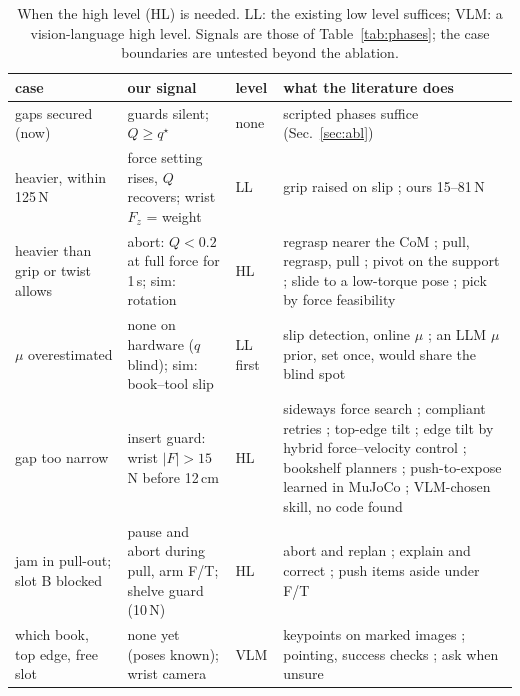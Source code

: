 \documentclass[10pt,twocolumn]{article}
\begin{document}
\begin{table}[t]\centering\footnotesize
\setlength{\tabcolsep}{1.8pt}
\begin{tabularx}{\columnwidth}{@{}>{\raggedright\arraybackslash}p{1.25cm}>{\raggedright\arraybackslash}p{1.95cm}l>{\raggedright\arraybackslash}X@{}}
\toprule
case & our signal & level & what the literature does \\
\midrule
gaps secured (now) & guards silent; $Q\ge q^\star$ & none & scripted phases suffice (Sec.~\ref{sec:abl}) \\
heavier, within 125\,N & force setting rises, $Q$ recovers; wrist $F_z$ = weight & LL & grip raised on slip
\cite{romano2011}; ours 15--81\,N \\
heavier than grip or twist allows & abort: $Q<0.2$ at full force for 1\,s; sim: rotation & HL & regrasp nearer
the CoM \cite{kolamuri2021rotation}; pull, regrasp, pull \cite{prats2008uji}; pivot on the support
\cite{hou2019pivot}; slide to a low-torque pose \cite{king2013}; pick by force feasibility \cite{holladay2021} \\
$\mu$ over\-estimated & none on hardware ($q$ blind); sim: book--tool slip & LL first & slip detection, online
$\mu$ \cite{su2015force,khamis2021friction,dong2019maintaining}; an LLM $\mu$ prior, set once, would share the
blind spot \cite{xie2024deligrasp} \\
gap too narrow & insert guard: wrist $|F|>15$\,N before 12\,cm & HL & sideways force search \cite{prats2008uji};
compliant retries \cite{ren2024collision}; top-edge tilt \cite{prats2008riai,wieczorek2022trixi}; edge tilt by
hybrid force--velocity control \cite{hou2019hybrid}; bookshelf planners \cite{cheng2024hidex,toussaint2020force};
push-to-expose learned in MuJoCo \cite{zhou2022ungraspable}; VLM-chosen skill, no code found \cite{ma2024dexdiff} \\
jam in pull-out; slot B blocked & pause and abort during pull, arm F/T; shelve guard (10\,N) & HL & abort and
replan \cite{guo2024doremi}; explain and correct \cite{liu2023reflect}; push items aside under F/T
\cite{hudson2025stow} \\
which book, top edge, free slot & none yet (poses known); wrist camera & VLM & keypoints on marked images
\cite{liu2024moka}; pointing, success checks \cite{geminiapi2026er}; ask when unsure \cite{ren2023knowno} \\
\bottomrule
\end{tabularx}
\caption{When the high level (HL) is needed. LL: the existing low level suffices; VLM: a vision-language high
level. Signals are those of Table~\ref{tab:phases}; the case boundaries are untested beyond the ablation.}
\label{tab:hl}
\end{table}
\end{document}

